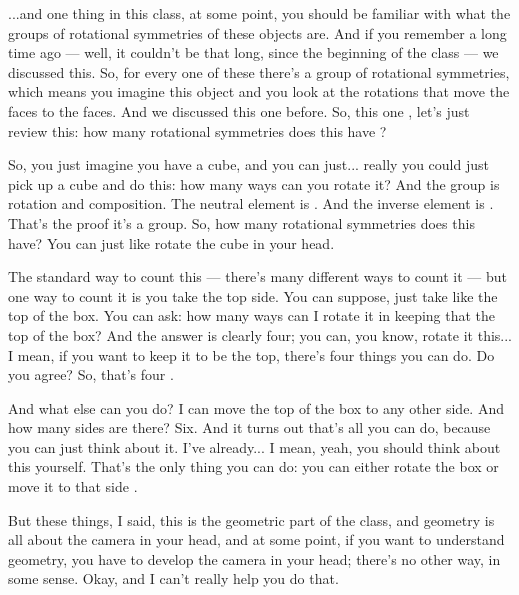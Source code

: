 \begin{speech}[00:33:22 - 00:35:30]
...and one thing in this class, at some point, you should be familiar with what the groups of rotational symmetries of these objects are. And if you remember a long time ago --- well, it couldn't be that long, since the beginning of the class --- we discussed this. So, for every one of these there's a group of rotational symmetries, which means you imagine this object and you look at the rotations that move the faces to the faces. And we discussed this one before. So, this one , let's just review this: how many rotational symmetries does this have ?

So, you just imagine you have a cube, and you can just... really you could just pick up a cube and do this: how many ways can you rotate it? And the group is rotation and composition. The neutral element is . And the inverse element is . That's the proof it's a group. So, how many rotational symmetries does this have? You can just like rotate the cube in your head.

The standard way to count this --- there's many different ways to count it --- but one way to count it is you take the top side. You can suppose, just take like the top of the box. You can ask: how many ways can I rotate it in keeping that the top of the box? And the answer is clearly four; you can, you know, rotate it this... I mean, if you want to keep it to be the top, there's four things you can do. Do you agree? So, that's four .

And what else can you do? I can move the top of the box to any other side. And how many sides are there? Six. And it turns out that's all you can do, because you can just think about it. I've already... I mean, yeah, you should think about this yourself. That's the only thing you can do: you can either rotate the box or move it to that side .

But these things, I said, this is the geometric part of the class, and geometry is all about the camera in your head, and at some point, if you want to understand geometry, you have to develop the camera in your head; there's no other way, in some sense. Okay, and I can't really help you do that.
\end{speech}

